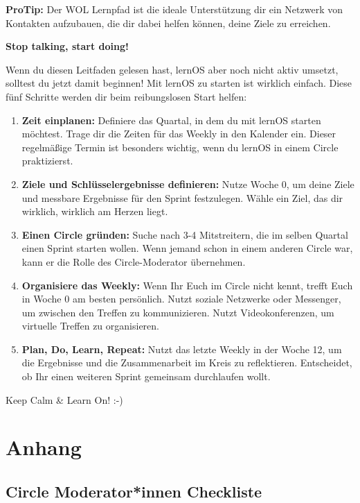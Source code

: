 \documentclass[
  ngerman,
  paper=a4,
,captions=tableheading
]{scrartcl}
\providecommand{\tightlist}{%
  \setlength{\itemsep}{0pt}\setlength{\parskip}{0pt}}
\begin{document}
\textbf{ProTip:} Der WOL Lernpfad ist die ideale Unterstützung dir ein
Netzwerk von Kontakten aufzubauen, die dir dabei helfen können, deine
Ziele zu erreichen.

\textbf{Stop talking, start doing!}

Wenn du diesen Leitfaden gelesen hast, lernOS aber noch nicht aktiv
umsetzt, solltest du jetzt damit beginnen! Mit lernOS zu starten ist
wirklich einfach. Diese fünf Schritte werden dir beim reibungslosen
Start helfen:

\begin{enumerate}
\def\labelenumi{\arabic{enumi}.}
\tightlist
\item
  \textbf{Zeit einplanen:} Definiere das Quartal, in dem du mit lernOS
  starten möchtest. Trage dir die Zeiten für das Weekly in den Kalender
  ein. Dieser regelmäßige Termin ist besonders wichtig, wenn du lernOS
  in einem Circle praktizierst.
\item
  \textbf{Ziele und Schlüsselergebnisse definieren:} Nutze Woche 0, um
  deine Ziele und messbare Ergebnisse für den Sprint festzulegen. Wähle
  ein Ziel, das dir wirklich, wirklich am Herzen liegt.
\item
  \textbf{Einen Circle gründen:} Suche nach 3-4 Mitstreitern, die im
  selben Quartal einen Sprint starten wollen. Wenn jemand schon in einem
  anderen Circle war, kann er die Rolle des Circle-Moderator übernehmen.
\item
  \textbf{Organisiere das Weekly:} Wenn Ihr Euch im Circle nicht kennt,
  trefft Euch in Woche 0 am besten persönlich. Nutzt soziale Netzwerke
  oder Messenger, um zwischen den Treffen zu kommunizieren. Nutzt
  Videokonferenzen, um virtuelle Treffen zu organisieren.
\item
  \textbf{Plan, Do, Learn, Repeat:} Nutzt das letzte Weekly in der Woche
  12, um die Ergebnisse und die Zusammenarbeit im Kreis zu reflektieren.
  Entscheidet, ob Ihr einen weiteren Sprint gemeinsam durchlaufen wollt.
\end{enumerate}

Keep Calm \& Learn On! :-)

\hypertarget{anhang}{%
\section{Anhang}\label{anhang}}

\hypertarget{circle-moderatorinnen-checkliste}{%
\subsection{Circle Moderator*innen
Checkliste}\label{circle-moderatorinnen-checkliste}}
\end{document}
